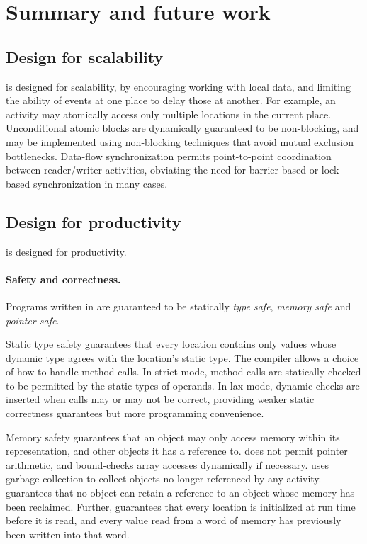 \section{Summary and future work}
\subsection{Design for scalability}
\Xten{} is designed for scalability, by encouraging working with local data,
and limiting the ability of events at one place to delay those at another. For
example, an activity may atomically access only multiple locations in the
current place. Unconditional atomic blocks are dynamically guaranteed to be
non-blocking, and may be implemented using non-blocking techniques that avoid
mutual exclusion bottlenecks. 
Data-flow synchronization permits point-to-point
coordination between reader/writer activities, obviating the need for
barrier-based or lock-based synchronization in many cases.

\subsection{Design for productivity}
\Xten{} is designed for productivity.

\paragraph{Safety and correctness.}


Programs written in \Xten{} are guaranteed to be statically
\emph{type safe}, \emph{memory safe} and \emph{pointer safe}. 

Static type safety guarantees that every location contains only values whose
dynamic type agrees with the location's static type. The compiler allows a
choice of how to handle method calls. In strict mode, method calls are
statically checked to be permitted by the static types of operands. In lax
mode, dynamic checks are inserted when calls may or may not be correct,
providing weaker static correctness guarantees but more programming
convenience. 

Memory safety guarantees that an object may only access memory within its
representation, and other objects it has a reference to. \Xten{} does not
permit 
pointer arithmetic, and bound-checks array accesses dynamically if necessary.
\Xten{} uses garbage collection to collect objects no longer referenced by any
activity. \Xten{} guarantees that no object can retain a reference to an
object whose memory has been reclaimed. Further, \Xten{} guarantees that every
location is initialized at run time before it is read, and every value read
from a word of memory has previously been written into that word.

